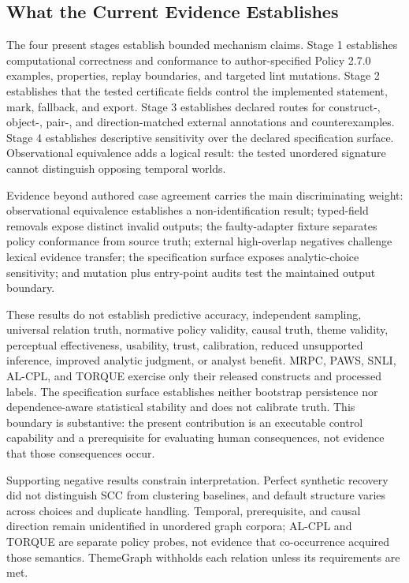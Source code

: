 \documentclass[manuscript,screen,review,anonymous]{acmart}
\begin{document}
\subsection{What the Current Evidence Establishes}

The four present stages establish bounded mechanism claims. Stage 1 establishes computational correctness and conformance to author-specified Policy 2.7.0 examples, properties, replay boundaries, and targeted lint mutations. Stage 2 establishes that the tested certificate fields control the implemented statement, mark, fallback, and export. Stage 3 establishes declared routes for construct-, object-, pair-, and direction-matched external annotations and counterexamples. Stage 4 establishes descriptive sensitivity over the declared specification surface. Observational equivalence adds a logical result: the tested unordered signature cannot distinguish opposing temporal worlds.

Evidence beyond authored case agreement carries the main discriminating weight: observational equivalence establishes a non-identification result; typed-field removals expose distinct invalid outputs; the faulty-adapter fixture separates policy conformance from source truth; external high-overlap negatives challenge lexical evidence transfer; the specification surface exposes analytic-choice sensitivity; and mutation plus entry-point audits test the maintained output boundary.

These results do not establish predictive accuracy, independent sampling, universal relation truth, normative policy validity, causal truth, theme validity, perceptual effectiveness, usability, trust, calibration, reduced unsupported inference, improved analytic judgment, or analyst benefit. MRPC, PAWS, SNLI, AL-CPL, and TORQUE exercise only their released constructs and processed labels. The specification surface establishes neither bootstrap persistence nor dependence-aware statistical stability and does not calibrate truth. This boundary is substantive: the present contribution is an executable control capability and a prerequisite for evaluating human consequences, not evidence that those consequences occur.

Supporting negative results constrain interpretation. Perfect synthetic recovery did not distinguish SCC from clustering baselines, and default structure varies across choices and duplicate handling. Temporal, prerequisite, and causal direction remain unidentified in unordered graph corpora; AL-CPL and TORQUE are separate policy probes, not evidence that co-occurrence acquired those semantics. ThemeGraph withholds each relation unless its requirements are met.
\end{document}
